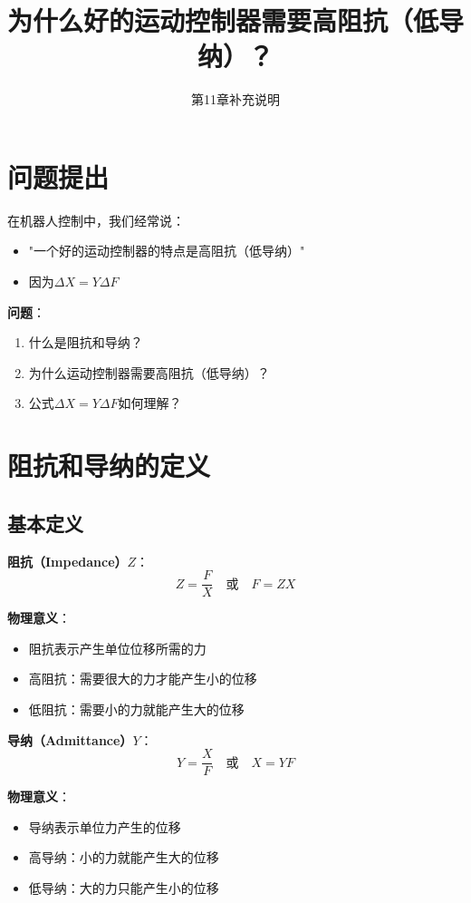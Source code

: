 \documentclass[12pt,a4paper]{article}
\title{为什么好的运动控制器需要高阻抗（低导纳）？}
\author{第11章补充说明}
\date{}
\begin{document}
\maketitle

\section{问题提出}

在机器人控制中，我们经常说：
\begin{itemize}
\item "一个好的运动控制器的特点是高阻抗（低导纳）"
\item 因为$\Delta X = Y \Delta F$
\end{itemize}

\textbf{问题}：
\begin{enumerate}
\item 什么是阻抗和导纳？
\item 为什么运动控制器需要高阻抗（低导纳）？
\item 公式$\Delta X = Y \Delta F$如何理解？
\end{enumerate}

\section{阻抗和导纳的定义}

\subsection{基本定义}

\textbf{阻抗（Impedance）$Z$}：
\begin{equation}
Z = \frac{F}{X} \quad \text{或} \quad F = ZX
\end{equation}

\textbf{物理意义}：
\begin{itemize}
\item 阻抗表示产生单位位移所需的力
\item 高阻抗：需要很大的力才能产生小的位移
\item 低阻抗：需要小的力就能产生大的位移
\end{itemize}

\textbf{导纳（Admittance）$Y$}：
\begin{equation}
Y = \frac{X}{F} \quad \text{或} \quad X = YF
\end{equation}

\textbf{物理意义}：
\begin{itemize}
\item 导纳表示单位力产生的位移
\item 高导纳：小的力就能产生大的位移
\item 低导纳：大的力只能产生小的位移
\end{itemize}
\end{document}
